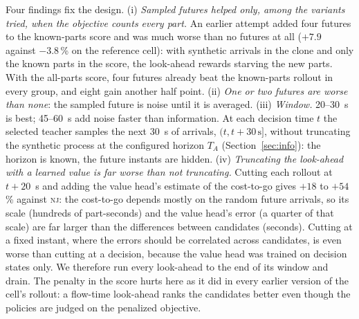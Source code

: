\documentclass[11pt,a4paper]{article}
\theoremstyle{plain}
\theoremstyle{definition}
\theoremstyle{remark}
\newcommand{\nj}{\textsc{nj}}
\begin{document}
\begin{table}[t]
\centering\small
\caption{Expert design study: paired $\Delta$ of the penalized flow time against \nj\
[\%, 95\,\% CI] of each look-ahead run over the trained S network of
Section~\ref{sec:ladder}, on the development realizations (reference cell and heavy
variant, 30 each; 60 general cells), score = mean of the three; and seconds per episode.
``Penalty in the cost'' scores the look-ahead on the penalized objective. Bold: the chosen
expert. Legacy arrival-time tie-break (Section~\ref{sec:dev}).}
\label{tab:variants}
\resizebox{\linewidth}{!}{}
\end{table}

Four findings fix the design. (i) \emph{Sampled futures helped only, among the variants tried, when the objective
counts every part.} An earlier attempt added four futures to the known-parts score and
was much worse than no futures at all ($+7.9$ against $-3.8$\,\% on the reference cell):
with synthetic arrivals in the clone and only the known parts in the score, the
look-ahead rewards starving the new parts. With the all-parts score, four futures already
beat the known-parts rollout in every group, and eight gain another half point. (ii)
\emph{One or two futures are worse than none}: the sampled future is noise until it is
averaged. (iii) \emph{Window.} 20--30~s is best; 45--60~s add noise faster than
information. At each decision time $t$ the selected teacher samples the next 30~s of arrivals, $(t,t+30\,\mathrm{s}]$, without truncating the synthetic process at the configured horizon $T_A$ (Section~\ref{sec:info}): the horizon is known, the future instants are hidden. (iv) \emph{Truncating the look-ahead with a learned value is far worse than
not truncating.} Cutting each rollout at $t+20$~s and adding the value head's estimate of
the cost-to-go gives $+18$ to $+54$\,\% against \nj: the cost-to-go depends mostly on the
random future arrivals, so its scale (hundreds of part-seconds) and the value head's
error (a quarter of that scale) are far larger than the differences between candidates
(seconds). Cutting at a fixed instant, where the errors should be correlated across
candidates, is even worse than cutting at a decision, because the value head was trained
on decision states only. We therefore run every look-ahead to the end of its window and
drain. The penalty in the score hurts here as it did in every earlier version of the
cell's rollout: a flow-time look-ahead ranks the candidates better even though the
policies are judged on the penalized objective.
\end{document}
